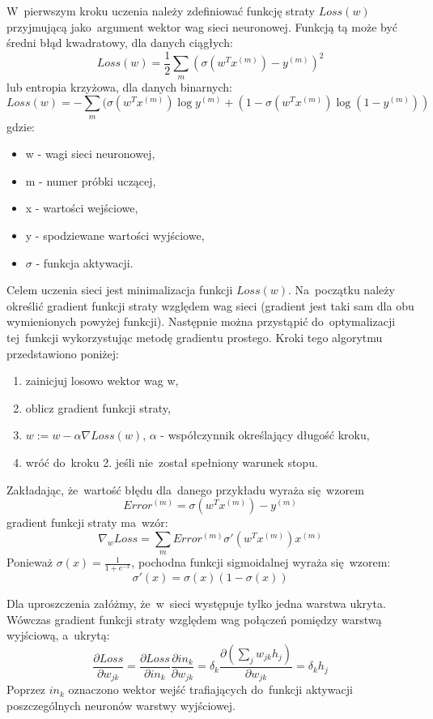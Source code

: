 W~pierwszym kroku uczenia należy zdefiniować funkcję straty $Loss(w)$ przyjmującą jako~argument wektor wag
sieci neuronowej. Funkcją tą może być średni błąd kwadratowy, dla danych ciągłych:\\
$$Loss(w)=\frac{1}{2}\sum\limits_{m}(\sigma(w^{T}x^{(m)}) - y^{(m)})^2$$
lub entropia krzyżowa, dla danych binarnych:
$$Loss(w)=-\sum\limits_m(\sigma(w^{T}x^{(m)})\log{y^{(m)}} + (1-\sigma(w^{T}x^{(m)})\log{(1-y^{(m)})})
$$
gdzie:
\begin{minipage}[t]{\textwidth}
\begin{itemize}
  \item w - wagi sieci neuronowej,
  \item m - numer próbki uczącej,
  \item x - wartości wejściowe,
  \item y - spodziewane wartości wyjściowe,
  \item $\sigma$ - funkcja aktywacji.
\end{itemize}
\end{minipage}

Celem uczenia sieci jest minimalizacja funkcji $Loss(w)$. Na~początku należy określić gradient funkcji straty
względem wag sieci (gradient jest taki sam dla obu wymienionych powyżej funkcji).
Następnie można przystąpić do~optymalizacji tej~funkcji wykorzystując metodę gradientu prostego.
Kroki tego algorytmu przedstawiono poniżej:
\begin{enumerate}
  \item zainicjuj losowo wektor wag w,
  \item oblicz gradient funkcji straty,
  \item $w:=w-\alpha \nabla Loss(w)$, $\alpha$ - współczynnik określający długość kroku,
  \item wróć do~kroku 2. jeśli nie~został spełniony warunek stopu.
\end{enumerate}

Zakładając, że~wartość błędu dla~danego przykładu wyraża się~wzorem
$$Error^{(m)}=\sigma(w^{T}x^{(m)})-y^{(m)}$$
gradient funkcji straty ma~wzór:
$$\nabla_{w}Loss=\sum\limits_{m}Error^{(m)}\sigma'(w^{T}x^{(m)})x^{(m)}$$
Ponieważ $\sigma(x)=\frac{1}{1+e^{-x}}$, pochodna funkcji sigmoidalnej wyraża się~wzorem:
$$\sigma'(x)=\sigma(x)(1-\sigma(x))$$

Dla uproszczenia załóżmy, że~w~sieci występuje tylko jedna warstwa ukryta. Wówczas gradient funkcji straty
względem wag połączeń pomiędzy warstwą wyjściową, a~ukrytą:
$$\frac{\partial Loss}{\partial w_{jk}}=\frac{\partial Loss}{\partial in_k}\frac{\partial
in_k}{\partial w_{jk}}= \delta_k \frac{\partial (\sum\limits_j w_{jk}h_j)}{\partial w_{jk}} = \delta_k h_j$$
Poprzez $in_k$ oznaczono wektor wejść trafiających do~funkcji aktywacji poszczególnych neuronów warstwy
wyjściowej.

